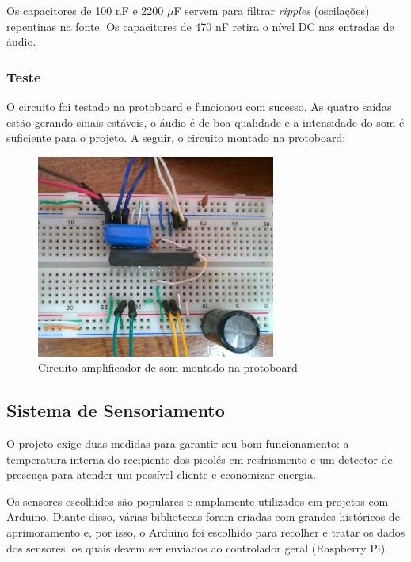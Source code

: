 Os capacitores de 100 nF e 2200 $\mu$F servem para filtrar \textit{ripples} (oscilações) repentinas na fonte. Os capacitores de 470 nF retira o nível DC nas entradas de áudio.

\subsubsection{Teste}

O circuito foi testado na protoboard e funcionou com sucesso. As quatro saídas estão gerando sinais estáveis, o áudio é de boa qualidade e a intensidade do som é suficiente para o projeto. A seguir, o circuito montado na protoboard:

\begin{figure}[H]
	\centering
    \includegraphics[width=0.7\textwidth]{figuras/Sistema_som_prot}
    \caption{Circuito amplificador de som montado na protoboard}
    \label{fig:Sistema_som_prot}
\end{figure}

\newpage
\subsection{Sistema de Sensoriamento}

O projeto exige duas medidas para garantir seu bom funcionamento: a temperatura interna do recipiente dos picolés em resfriamento e um detector de presença para atender um possível cliente e economizar energia.

Os sensores escolhidos são populares e amplamente utilizados em projetos com Arduino. Diante disso, várias bibliotecas foram criadas com grandes históricos de aprimoramento e, por isso, o Arduino foi escolhido para recolher e tratar os dados dos sensores, os quais devem ser enviados ao controlador geral (Raspberry Pi).

